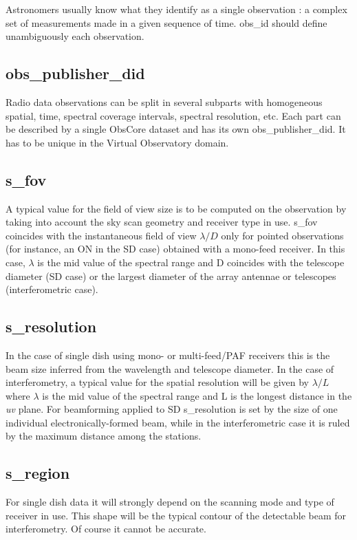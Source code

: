 \documentclass[11pt,a4paper]{ivoa}
\begin{document}
Astronomers usually know what they identify as a single observation : a complex set of 
measurements made in a given sequence of time. obs\_id should define unambiguously each 
observation.

\subsection{obs\_publisher\_did}

Radio data observations can be split in several subparts with homogeneous spatial, 
time, spectral coverage intervals, spectral resolution, etc. Each part can be described by 
a single ObsCore dataset and has its own obs\_publisher\_did. It has to be unique in the 
Virtual Observatory domain.

\subsection{s\_fov}
\label{sec:fov}

A typical value for the field of view size is to be computed on the observation by taking into account the sky scan geometry and receiver type in use.
s\_fov coincides with the instantaneous field of view $\lambda / D$ only for pointed observations (for instance, an ON in the SD case) obtained with a mono-feed receiver. In this case, $\lambda$ is the mid value of the spectral range and D coincides with the telescope diameter (SD case) or the largest diameter of the array antennae or telescopes (interferometric case). 



\subsection{s\_resolution}
\label{sec:res}
In the case of single dish using mono- or multi-feed/PAF receivers this is the beam size inferred from the wavelength and telescope diameter. 
In the case of interferometry, a typical value for the spatial resolution will be given by $\lambda / L$ where $\lambda$ 
is the mid value of the spectral range and L is the longest distance in the \emph{uv} plane.
For beamforming applied to SD s\_resolution is set by the size of one individual electronically-formed beam, while in the interferometric case it is ruled by the maximum distance among the stations.
 
 
\subsection{s\_region}
For single dish data it will strongly depend on the scanning mode and type of receiver in use.
This shape will be the typical contour of the detectable beam for interferometry. Of course it cannot be accurate. 
\end{document}
